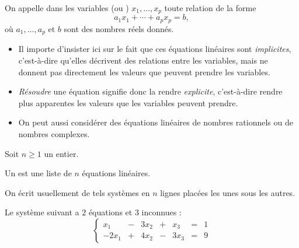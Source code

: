 \documentclass[class=report,crop=false]{standalone}
\begin{document}
\begin{definition}
On appelle  dans les variables (ou )
$x_1,\ldots,x_p$ toute relation de la forme
\begin{equation}
  a_1 x_1 + \cdots + a_p x_p = b,
\end{equation}
où $a_1, \ldots, a_p $ et $b$ sont des nombres réels donnés.
\end{definition}

\begin{remarque*}
\sauteligne
\begin{itemize}
  \item Il importe d'insister ici sur le fait que ces équations linéaires sont
\emph{implicites}, c'est-à-dire qu'elles décrivent des relations
entre les variables, mais ne donnent pas directement les valeurs que
peuvent prendre les variables.

  \item \emph{Résoudre} une équation signifie donc la rendre
\emph{explicite}, c'est-à-dire rendre plus apparentes les valeurs
que les variables peuvent prendre.

  \item On peut aussi considérer des équations linéaires de nombres rationnels ou de nombres complexes.
\end{itemize}
\end{remarque*}



Soit $n\ge 1$ un entier.
\begin{definition}
Un  
est une liste de $n$ équations linéaires.
\end{definition}

On écrit usuellement de tels systèmes en $n$ lignes placées les unes sous les autres.

\begin{exemple}
\label{exsyslin1}
 Le système suivant a $2$ équations et $3$ inconnues :
\[ \left\{  \begin{array}{ccccccc}
 x_1 &- &3x_2 &+ &x_3 & =  &1\\
 -2x_1 &+ &4x_2 &- &3x_3 & =  &9
 \end{array} \right .
\]
\end{exemple}
\end{document}
